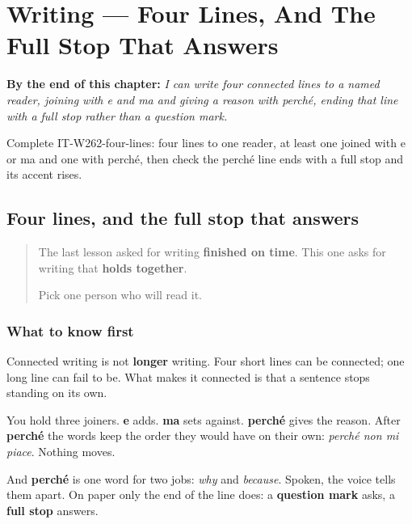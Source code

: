 
\chapter{Writing --- Four Lines, And The Full Stop That Answers}
\label{ch:it-four-lines}

\begin{chapteropening}
\textbf{By the end of this chapter:} \emph{I can write four connected lines to a named reader, joining with e and ma and giving a reason with perché, ending that line with a full stop rather than a question mark.}

Complete IT-W262-four-lines: four lines to one reader, at least one joined with e or ma and one with perché, then check the perché line ends with a full stop and its accent rises.
\end{chapteropening}

\section[(four lines)]{Four lines, and the full stop that answers}

\label{lesson:IT-W262-four-lines}



\begin{quote}
The last lesson asked for writing \textbf{finished on time}. This one asks for writing that \textbf{holds together}.

Pick one person who will read it.
\end{quote}

\subsection*{What to know first}
Connected writing is not \textbf{longer} writing. Four short lines can be connected; one long line can fail to be. What makes it connected is that a sentence stops standing on its own.

You hold three joiners. \textbf{e} adds. \textbf{ma} sets against. \textbf{perché} gives the reason. After \textbf{perché} the words keep the order they would have on their own: \emph{perché non mi piace}. Nothing moves.

And \textbf{perché} is one word for two jobs: \emph{why} and \emph{because}. Spoken, the voice tells them apart. On paper only the end of the line does: a \textbf{question mark} asks, a \textbf{full stop} answers.

